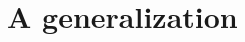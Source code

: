 \documentclass[12pt]{amsart}
\begin{document}
\section{A generalization}	\label{sec:generalization}																																																																																																																																																																																																																																																																																																																																																																																																																																																																																																																																																																																																																																																																																																																																																																																																																																																																																																																																																																																																																																																																																																																																																																																																																																																																																																																																																																																																																																																																																																																																																																																																																																																																																																																																																																																																																																																																																																																																																																																																																																																																																																																																																																																																																																																																																																																																																																																																																																																																																																																																																																																																																																																																																																																																																																																																																																																																																																																																																																																																																																																																																																																																																																																																			
\end{document}

